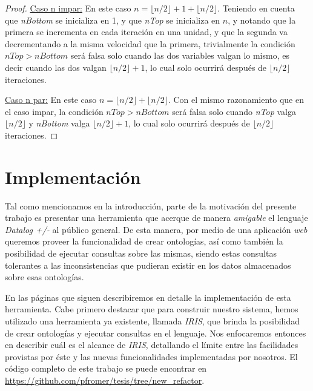 \documentclass[11pt,a4paper,twoside]{tesis}
\newcommand{\parteEntera}{\lfloor n/2 \rfloor}
\begin{document}
\begin{proof}
\underline{Caso n impar:} En este caso $n = \parteEntera + 1 + \parteEntera$. Teniendo en cuenta que \textit{nBottom} se inicializa en 1, y que \textit{nTop} se inicializa en $n$, y notando que la primera se incrementa en cada iteración en una unidad, y que la segunda va decrementando a la misma velocidad que la primera, trivialmente la condición $nTop > nBottom$ será falsa solo cuando las dos variables valgan lo mismo, es decir cuando las dos valgan $\parteEntera + 1$, lo cual solo ocurrirá después de $\parteEntera$ iteraciones. 

\underline{Caso n par:} En este caso $n = \parteEntera + \parteEntera$. Con el mismo razonamiento que en el caso impar, la condición $nTop > nBottom$ será falsa solo cuando \textit{nTop} valga $\parteEntera$ y \textit{nBottom} valga $\parteEntera + 1$, lo cual solo ocurrirá después de $\parteEntera$ iteraciones. 

\end{proof}

















\chapter{Implementación}

Tal como mencionamos en la introducción, parte de la motivación del presente trabajo es presentar una herramienta que acerque de manera \textit{amigable} el lenguaje \textit{Datalog +/-} al público general. De esta manera, por medio de una aplicación \textit{web} queremos proveer la funcionalidad de crear ontologías, así como también la posibilidad de ejecutar consultas sobre las mismas, siendo estas consultas tolerantes a las inconsistencias que pudieran existir en los datos almacenados sobre esas ontologías. 

En las páginas que siguen describiremos en detalle la implementación de esta herramienta. Cabe primero destacar que para construir nuestro sistema, hemos utilizado una herramienta ya existente, llamada \textit{IRIS}, que brinda la posibilidad de crear ontologías y ejecutar consultas en el lenguaje. Nos enfocaremos entonces en describir cuál es el alcance de \textit{IRIS}, detallando el límite entre las facilidades provistas por éste y las nuevas funcionalidades implementadas por nosotros. El código completo de este trabajo se puede encontrar en \url{https://github.com/pfromer/tesis/tree/new_refactor}.
\end{document}
